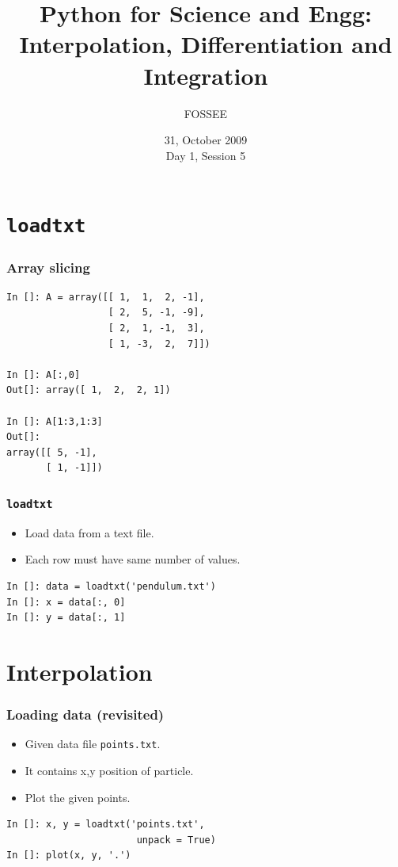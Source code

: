 \documentclass[14pt,compress]{beamer}
\title[Calculus]{Python for Science and Engg: Interpolation, Differentiation and Integration}
\author[FOSSEE] {FOSSEE}
\institute[IIT Bombay] {Department of Aerospace Engineering\\IIT Bombay}
\date[] {31, October 2009\\Day 1, Session 5}
\newcommand{\typ}[1]{\lstinline{#1}}
\begin{document}
\begin{frame}
  \titlepage
\end{frame}


\section{\typ{loadtxt}}

\begin{frame}[fragile]
  \frametitle{Array slicing}
  \begin{lstlisting}
In []: A = array([[ 1,  1,  2, -1],
                  [ 2,  5, -1, -9],
                  [ 2,  1, -1,  3],
                  [ 1, -3,  2,  7]])

In []: A[:,0]
Out[]: array([ 1,  2,  2, 1])

In []: A[1:3,1:3]
Out[]: 
array([[ 5, -1],
       [ 1, -1]])
\end{lstlisting}
\end{frame}

\begin{frame}[fragile]
  \frametitle{\typ{loadtxt}}
  \begin{itemize}
  \item Load data from a text file.
  \item Each row must have same number of values.
  \end{itemize}
\begin{lstlisting}
In []: data = loadtxt('pendulum.txt')
In []: x = data[:, 0]
In []: y = data[:, 1]
\end{lstlisting}
\end{frame}


\section{Interpolation}
\begin{frame}[fragile]
\frametitle{Loading data (revisited)}
\begin{itemize}
  \item Given data file \typ{points.txt}.
  \item It contains x,y position of particle.
  \item Plot the given points.
\end{itemize}
\begin{lstlisting}
In []: x, y = loadtxt('points.txt',
                       unpack = True)
In []: plot(x, y, '.')
\end{lstlisting}
\end{frame}
\end{document}
